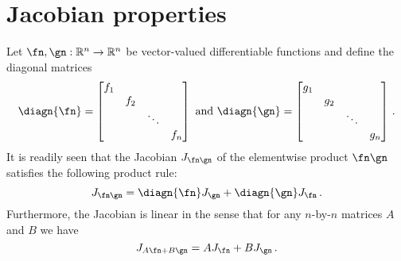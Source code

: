 \section{Jacobian properties}%
\label{sub:jacobian_properties}
Let $\fn, \gn : \mathbb{R}^n \to \mathbb{R}^n$ be vector-valued differentiable functions and define the diagonal matrices
\[
  \diagn{\fn} =
  \begin{bmatrix}
    f_1 &     &        &     \\
        & f_2 &        &     \\
        &     & \ddots &     \\
        &     &        & f_n \\
  \end{bmatrix}
  \text{ and }
  \diagn{\gn} =
  \begin{bmatrix}
    g_1 &     &        &     \\
        & g_2 &        &     \\
        &     & \ddots &     \\
        &     &        & g_n \\
  \end{bmatrix} \,.
\]
It is readily seen that the Jacobian $J_{\fn\gn}$ of the elementwise product $\fn\gn$ satisfies the following product rule:
\begin{equation}
  \label{eq:jacobian_product_rule}
  J_{\fn\gn} = \diagn{\fn}J_{\gn} + \diagn{\gn}J_{\fn} \,.
\end{equation}
Furthermore, the Jacobian is linear in the sense that for any $n$-by-$n$ matrices $A$ and $B$ we have
\begin{equation}
  \label{eq:jacobian_linear}
  J_{A\fn + B\gn} = AJ_{\fn} + BJ_{\gn} \,.
\end{equation}
